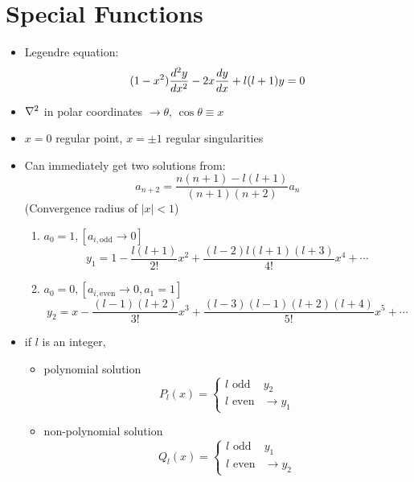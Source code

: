\documentclass[Maths.tex]{subfiles}
\begin{document}
\section{Special Functions}
\begin{itemize}
    \item Legendre equation:
    \begin{equation*}
        (1-x^2)\frac{d^2 y}{dx^2} - 2x\frac{dy}{dx} + l(l+1)y = 0
    \end{equation*}
    \item $\nabla^2$ in polar coordinates $\to \theta,\, \cos\theta \equiv x$
    \item $x=0$ regular point, $x = \pm 1$ regular singularities
    \item Can immediately get two solutions from:
    \begin{equation*}
        a_{n+2} = \frac{n(n+1) - l(l+1)}{(n+1)(n+2)}a_n
    \end{equation*}
    (Convergence radius of $|x| < 1$)
    \begin{enumerate}
        \item $a_0 = 1, [a_{i,\text{odd}} \to 0]$
        \begin{equation*}
            y_1 = 1 - \frac{l(l+1)}{2!}x^2 + \frac{(l-2)l(l+1)(l+3)}{4!}x^4 + \cdots
        \end{equation*}
        \item $a_0 = 0, [a_{i,\text{even}} \to 0,a_1 = 1]$
        \begin{equation*}
            y_2 = x - \frac{(l-1)(l+2)}{3!}x^3 + \frac{(l-3)(l-1)(l+2)(l+4)}{5!}x^5 + \cdots
        \end{equation*}
    \end{enumerate}
    \item if $l$ is an integer,
    \begin{itemize}
        \item polynomial solution
        \begin{equation*}
            P_l(x) = \begin{cases} l\text{ odd} & y_2 \\ l\text{ even} & \to y_1 \end{cases}
        \end{equation*}
        \item non-polynomial solution
        \begin{equation*}
            Q_l(x) = \begin{cases} l\text{ odd} & y_1 \\ l\text{ even} & \to y_2 \end{cases}

\end{equation*}
\end{itemize}
\end{itemize}
\end{document}
